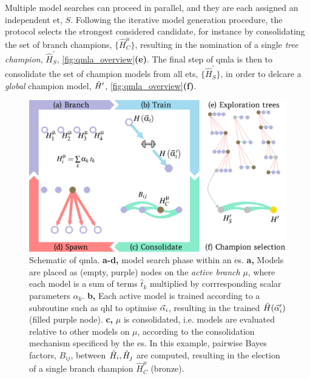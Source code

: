 Multiple model searches can proceed in parallel, and they are each assigned an independent \gls{et}, $S$. 
Following the iterative model generation procedure, the protocol selects the strongest considered candidate,
    for instance by consolidating the set of branch champions, $\{\hat{H}_C^{\mu} \}$,
    resulting in the nomination of a single \emph{tree champion}, $\hat{H}_{S}^{\prime}$, \cref{fig:qmla_overview}\textbf{(e)}.
The final step of \gls{qmla} is then to consolidate the set of champion models from all \glspl{et}, $\{\hat{H}_{S}^{\prime} \}$, 
    in order to delcare a \emph{global} \gls{champion model}, $\hat{H}^{\prime}$, \cref{fig:qmla_overview}\textbf{(f)}. 

\begin{figure}[t!]
    \begin{center}
        \includegraphics{algorithms/figures/overview.jpg}
    \end{center}
    \caption[Quantum Model Learning Agent overview]{
        Schematic of \acrfull{qmla}. 
        \textbf{a-d,} \Gls{model search} phase within an \acrfull{es}.
        \textbf{a,} Models are placed as (empty, purple) nodes on the \emph{active branch} $\mu$, 
            where each model is a sum of terms $\hat{t}_k$ multiplied by corrresponding scalar parameters $\alpha_k$. 
        \textbf{b,} Each active model is trained according to a subroutine such as 
            \acrlong{qhl} to optimise $\vec{\alpha}_i$, 
            resulting in the trained $\hat{H}(\vec{\alpha}_i^{\prime})$ (filled purple node). 
        \textbf{c,} $\mu$ is consolidated, i.e. models are evaluated relative to other
            models on $\mu$, according to the consolidation mechanism specificed by the \gls{es}.
            In this example, pairwise Bayes factors, $B_{ij}$, between $\hat{H}_i, \hat{H}_j$ are computed, 
            resulting in the election of a single branch champion $\hat{H}_C^{\mu}$ (bronze). 
}
\end{figure}
